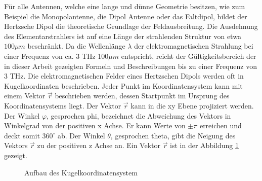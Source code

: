 Für alle Antennen, welche eine lange und dünne Geometrie besitzen, wie zum Beispiel die Monopolantenne, die Dipol Antenne oder das Faltdipol, bildet der Hertzsche Dipol die theoretische Grundlage der Feldausbreitung. Die Ausdehnung des Elementarstrahlers ist auf eine Länge der strahlenden Struktur von etwa $100\mu m$ beschränkt. Da die Wellenlänge $\lambda$ der elektromagnetischen Strahlung bei einer Frequenz von ca. 3 THz 100$\mu m$ entspricht, reicht der Gültigkeitsbereich der in dieser Arbeit gezeigten Formeln und Beschreibungen bis zu einer Frequenz von 3 THz.
Die elektromagnetischen Felder eines Hertzschen Dipols werden oft in Kugelkoordinaten beschrieben. Jeder Punkt im Koordinatensystem kann mit einem Vektor $\vec{r}$ beschrieben werden, dessen Startpunkt im Ursprung des Koordinatensystems liegt. Der Vektor $\vec{r}$ kann in die xy Ebene projiziert werden. Der Winkel $\varphi$, gesprochen phi, bezeichnet die Abweichung des Vektors in Winkelgrad von der positiven x Achse. Er kann Werte von $\pm \pi$ erreichen und deckt somit $360^\circ$ ab. Der Winkel $\theta$, gesprochen theta, gibt die Neigung  des Vektors $\vec{r}$ zu der positiven z Achse an. Ein Vektor $\vec{r}$ ist in der Abbildung \ref{FerdVektor} gezeigt.




\begin{figure}[!ht]
\begin{center}
\end{center}
	\caption{Aufbau des Kugelkoordinatensystem}
	\label{FerdVektor}
\end{figure}

